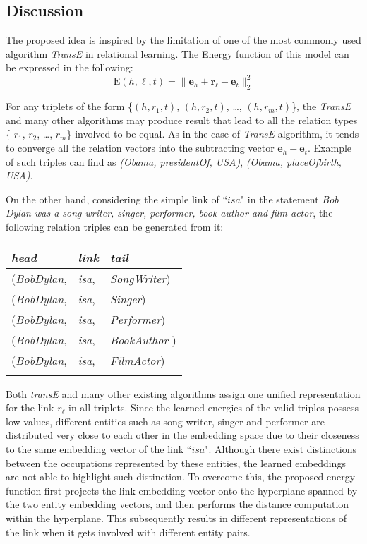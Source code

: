 \documentclass[9pt]{sig-alternate-05-2015}
\begin{document}
\subsection{Discussion}
The proposed idea is inspired by the limitation of one of the most commonly used algorithm \emph{TransE} \cite{bordes_translating_2013}  in relational learning. The Energy function of this model can be expressed in the following:
\begin{equation}
\mathrm{E}{(h,\ell, t)} = \|\bm{e}_h + \bm{r}_{\ell}-\bm{e}_t\|_2^2
\end{equation}

For any triplets of the form \{$(h, r_1, t)$, $(h, r_2, t)$, \ldots, $(h, r_m, t)$\}, the \emph{TransE}  and many other algorithms may produce result that lead to all the relation types  \{ $r_1$, $r_2$, \ldots, $r_m$\} involved to be equal. As in the case of \emph{TransE} algorithm, it tends to converge all the relation vectors into the subtracting vector  $\bm{e}_h - \bm{e}_t$.  Example of such triples can find as  \emph{(Obama, presidentOf, USA)}, \emph{(Obama, placeOfbirth, USA)}.

 On the other hand, considering the simple link of ``$isa$" in  the statement \emph{Bob Dylan was a song writer, singer, performer, book author and film actor}, the following relation triples can be generated from it:
\\
\begin{tabular}[center]{l l l} 
 \\
 \emph{head} & \emph{link} & \emph{tail} \\
 \hline 
 (\emph{BobDylan}, & \emph{isa}, & \emph{SongWriter}) \\
 (\emph{BobDylan}, & \emph{isa}, & \emph{Singer}) \\
  (\emph{BobDylan}, & \emph{isa}, & \emph{Performer}) \\
   (\emph{BobDylan}, & \emph{isa}, & \emph{BookAuthor }) \\
    (\emph{BobDylan}, & \emph{isa}, & \emph{FilmActor}) \\\\
 \end{tabular}
 
Both \emph{transE} and many other existing algorithms assign one unified representation for the link $r_{\ell}$ in all triplets.  Since the learned energies of the valid triples  possess low values,  different entities such as song writer, singer and performer are  distributed very close to each other in the embedding space due to their closeness to the same embedding vector of  the link ``$isa$". Although there exist distinctions between the occupations represented by these entities, the learned embeddings are not able to highlight such distinction. To overcome this,  the proposed energy function  first projects the link embedding vector onto the hyperplane spanned by the two  entity embedding vectors, and then performs the distance computation within the hyperplane.  This subsequently results in different representations of the link when it gets involved with different entity pairs.  
\end{document}
